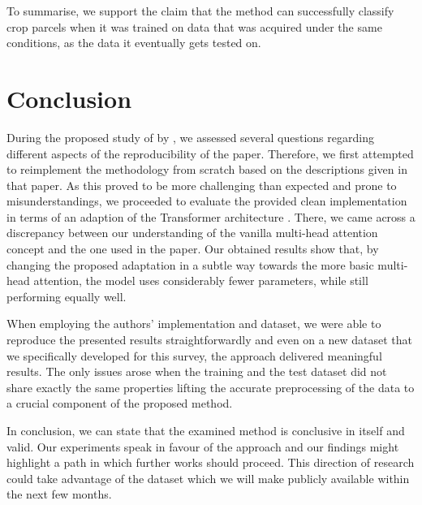 To summarise, we support the claim that the method can successfully classify crop parcels when it was trained on data that was acquired under the same conditions, as the data it eventually gets tested on.

\section{Conclusion}

During the proposed study of  by \textcite{Garnot20:SIT}, we assessed several questions regarding different aspects of the reproducibility of the paper.
Therefore, we first attempted to reimplement the methodology from scratch based on the descriptions given in that paper.
As this proved to be more challenging than expected and prone to misunderstandings, we proceeded to evaluate the provided clean implementation in terms of an adaption of the Transformer architecture \parencite{Vaswani17:Attention}.
There, we came across a discrepancy between our understanding of the vanilla multi-head attention concept and the one used in the paper.
Our obtained results show that, by changing the proposed adaptation in a subtle way towards the more basic multi-head attention, the model uses considerably fewer parameters, while still performing equally well.

When employing the authors' implementation and dataset, we were able to reproduce the presented results straightforwardly and even on a new dataset that we specifically developed for this survey, the approach delivered meaningful results.
The only issues arose when the training and the test dataset did not share exactly the same properties lifting the accurate preprocessing of the data to a crucial component of the proposed method.

In conclusion, we can state that the examined method is conclusive in itself and valid.
Our experiments speak in favour of the approach and our findings might highlight a path in which further works should proceed.
This direction of research could take advantage of the dataset which we will make publicly available within the next few months.

%
